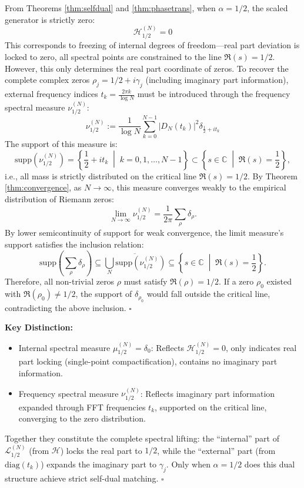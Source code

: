 \documentclass[12pt,a4paper]{amsart}
\theoremstyle{plain}
\theoremstyle{definition}
\theoremstyle{remark}
\begin{document}
From Theorems \ref{thm:selfdual} and \ref{thm:phasetrans}, when $\alpha=1/2$, the scaled generator is strictly zero:
\begin{equation}
\mathcal{H}_{1/2}^{(N)}=0
\end{equation}
This corresponds to freezing of internal degrees of freedom---real part deviation is locked to zero, all spectral points are constrained to the line $\Re(s)=1/2$. However, this only determines the real part coordinate of zeros. To recover the complete complex zeros $\rho_j = 1/2 + i\gamma_j$ (including imaginary part information), external frequency indices $t_k = \frac{2\pi k}{\log N}$ must be introduced through the frequency spectral measure $\nu_{1/2}^{(N)}$:
\begin{equation}
\nu_{1/2}^{(N)} := \frac{1}{\log N}\sum_{k=0}^{N-1} |D_N(t_k)|^2 \delta_{\frac{1}{2} + i t_k}
\end{equation}
The support of this measure is:
\begin{equation}
\mathrm{supp}(\nu_{1/2}^{(N)}) = \left\{\frac{1}{2} + i t_k \;\middle|\; k=0,1,\dots,N-1\right\} \subset \left\{s\in\mathbb{C} \;\middle|\; \Re(s)=\frac{1}{2}\right\},
\end{equation}
i.e., all mass is strictly distributed on the critical line $\Re(s)=1/2$. By Theorem \ref{thm:convergence}, as $N\to\infty$, this measure converges weakly to the empirical distribution of Riemann zeros:
\begin{equation}
\lim_{N\to\infty} \nu_{1/2}^{(N)} = \frac{1}{2\pi}\sum_{\rho} \delta_{\rho}.
\end{equation}
By lower semicontinuity of support for weak convergence, the limit measure's support satisfies the inclusion relation:
\begin{equation}
\mathrm{supp}\left(\sum_{\rho} \delta_{\rho}\right) \subseteq \overline{\bigcup_{N} \mathrm{supp}(\nu_{1/2}^{(N)})} \subseteq \left\{s \in \mathbb{C} \;\middle|\; \Re(s)=\frac{1}{2}\right\}.
\end{equation}
Therefore, all non-trivial zeros $\rho$ must satisfy $\Re(\rho)=1/2$. If a zero $\rho_0$ existed with $\Re(\rho_0)\neq 1/2$, the support of $\delta_{\rho_0}$ would fall outside the critical line, contradicting the above inclusion. $\square$

\textbf{Key Distinction:}
\begin{itemize}
    \item Internal spectral measure $\mu_{1/2}^{(N)}=\delta_0$: Reflects $\mathcal{H}_{1/2}^{(N)}=0$, only indicates real part locking (single-point compactification), contains no imaginary part information.
    \item Frequency spectral measure $\nu_{1/2}^{(N)}$: Reflects imaginary part information expanded through FFT frequencies $t_k$, supported on the critical line, converging to the zero distribution.
\end{itemize}
Together they constitute the complete spectral lifting: the ``internal'' part of $\mathcal{L}_{1/2}^{(N)}$ (from $\mathcal{H}$) locks the real part to $1/2$, while the ``external'' part (from $\mathrm{diag}(t_k)$) expands the imaginary part to $\gamma_j$. Only when $\alpha=1/2$ does this dual structure achieve strict self-dual matching. $\square$
\end{document}
